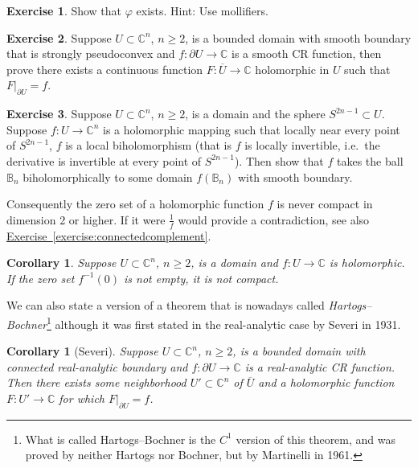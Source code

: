 \documentclass[12pt,openany]{book}
\newcommand{\C}{{\mathbb{C}}}
\newcommand{\bB}{{\mathbb{B}}}
\newcommand{\myindex}[1]{#1\index{#1}}
\theoremstyle{plain}
\newtheorem{cor}[thm]{Corollary}
\theoremstyle{remark}
\theoremstyle{definition}
\newenvironment{exbox}{%
    \def\FrameCommand{\vrule width 1pt \relax\hspace {10pt}}%
    \MakeFramed {\advance \hsize -\width \FrameRestore }%
}{%
    \endMakeFramed
}
\theoremstyle{exercise}
\newtheorem{exercise}{Exercise}[section]
\theoremstyle{example}
\newcommand{\exerciseref}[1]{\hyperref[#1]{Exercise~\ref*{#1}}}
\begin{document}
\begin{exbox}
\begin{exercise}
Show that $\varphi$ exists.  Hint: Use mollifiers.
\end{exercise}

\begin{exercise}
Suppose $U \subset \C^n$, $n \geq 2$, is a bounded domain with smooth boundary that is
strongly pseudoconvex
and $f \colon \partial U \to \C$ is a smooth CR function, then prove
there exists a continuous function $F \colon \overline{U} \to \C$
holomorphic in $U$
such that $F|_{\partial U} = f$.
\end{exercise}

\begin{exercise}
Suppose $U \subset \C^n$, $n \geq 2$, is a domain and the sphere $S^{2n-1}
\subset U$.  Suppose $f \colon U \to \C^n$ is a holomorphic mapping
such that locally near every point of $S^{2n-1}$, $f$ is a local
biholomorphism (that is $f$ is locally invertible, i.e.\ the 
derivative is invertible at every point of $S^{2n-1}$).  Then show that
$f$ takes the ball $\bB_n$ biholomorphically to some domain $f(\bB_n)$ with smooth
boundary.
\end{exercise}
\end{exbox}

Consequently the zero set of a holomorphic function $f$ is never compact in
dimension 2 or higher.  If it
were $\frac{1}{f}$ would provide a contradiction, see also
\exerciseref{exercise:connectedcomplement}.

\begin{cor}
Suppose $U \subset \C^n$, $n \geq 2$, is a domain and $f \colon U \to \C$ is
holomorphic.  If the zero set $f^{-1}(0)$ is not empty, it is not compact.
\end{cor}

We can also state a version of a theorem that is nowadays called
\emph{\myindex{Hartogs--Bochner}}\footnote{What is called
Hartogs--Bochner is 
the $C^1$ version of this theorem, and was proved by neither Hartogs nor
Bochner, but by Martinelli in 1961.}
although it was first stated
in the real-analytic case by
Severi in 1931.

\begin{cor}[Severi]
Suppose $U \subset \C^n$, $n \geq 2$, is a bounded domain with connected real-analytic boundary and
$f \colon \partial U \to \C$ is a real-analytic CR function.  Then
there exists some neighborhood $U' \subset \C^n$ of $\overline{U}$
and a holomorphic function $F \colon U' \to \C$ for which
$F|_{\partial U} = f$.
\end{cor}
\end{document}
